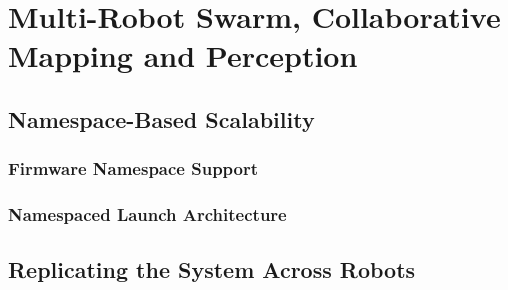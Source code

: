 
\chapter{Multi-Robot Swarm, Collaborative Mapping and Perception}
\label{chap:swarm}


\section{Namespace-Based Scalability}
\label{sec:namespace_scalability}

\subsection{Firmware Namespace Support}
\label{subsec:firmware_namespace}

\subsection{Namespaced Launch Architecture}
\label{subsec:namespaced_launch}

\section{Replicating the System Across Robots}
\label{sec:replicating_robots}

